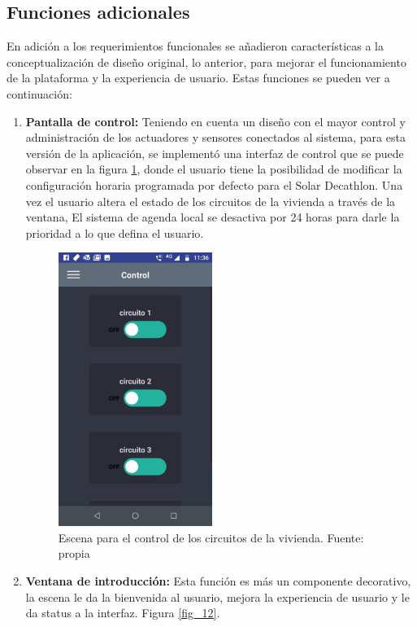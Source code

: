 \subsection{Funciones adicionales}

En adición a los requerimientos funcionales se añadieron características a la conceptualización de diseño original, lo anterior, para mejorar el funcionamiento de la plataforma y la experiencia de usuario. Estas funciones se pueden ver a continuación:

\begin{enumerate}
	\item \textbf{Pantalla de control:} Teniendo en cuenta un diseño con el mayor control y administración de los actuadores y sensores conectados al sistema, para esta versión de la aplicación, se implementó una interfaz de control que se puede observar en la figura \ref{fig_16}, donde el usuario tiene la posibilidad de modificar la configuración horaria programada por defecto para el Solar Decathlon. Una vez el usuario altera el estado de los circuitos de la vivienda a través de la ventana, El sistema de agenda local se desactiva por 24 horas para darle la prioridad a lo que defina el usuario.
	
	\begin{figure}[htbp]
		\centerline{\includegraphics[width=5cm]{./figuras/mobile_control.jpeg}}
		\caption{Escena para el control de los circuitos de la vivienda. Fuente: propia}
		\label{fig_16}
	\end{figure}
	
	\item \textbf{Ventana de introducción:} Esta función es más un componente decorativo, la escena le da la bienvenida al usuario, mejora la experiencia de usuario y le da status a la interfaz. Figura \ref{fig_12}.
	

\end{enumerate}
